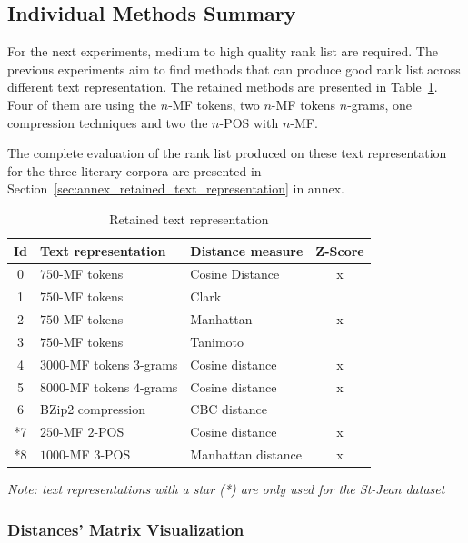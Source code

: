 \subsection{Individual Methods Summary}

For the next experiments, medium to high quality rank list are required.
The previous experiments aim to find methods that can produce good rank list across different text representation.
The retained methods are presented in Table~\ref{tab:9rl}.
Four of them are using the $n$-MF tokens, two $n$-MF tokens $n$-grams, one compression techniques and two the $n$-POS with $n$-MF.

The complete evaluation of the rank list produced on these text representation for the three literary corpora are presented in Section~\ref{sec:annex_retained_text_representation} in annex.

\begin{table}
  \centering
  \caption{Retained text representation}
  \label{tab:9rl}
  \begin{tabular}{c l l c}
    \toprule
    Id &
    Text representation &
    Distance measure &
    Z-Score \\
    \midrule
    0 & $750$-MF tokens & Cosine Distance & x\\
    1 & $750$-MF tokens & Clark & \\
    2 & $750$-MF tokens & Manhattan & x\\
    3 & $750$-MF tokens & Tanimoto & \\
    4 & $3000$-MF tokens $3$-grams & Cosine distance & x\\
    5 & $8000$-MF tokens $4$-grams & Cosine distance & x\\
    6 & BZip2 compression & CBC distance & \\
    *7 & $250$-MF $2$-POS & Cosine distance & x\\
    *8 & $1000$-MF $3$-POS & Manhattan distance & x\\
    \bottomrule
  \end{tabular}

  \vspace{0.2cm}
  \textit{Note: text representations with a star (*) are only used for the St-Jean dataset}
\end{table}

\subsubsection{Distances' Matrix Visualization}

